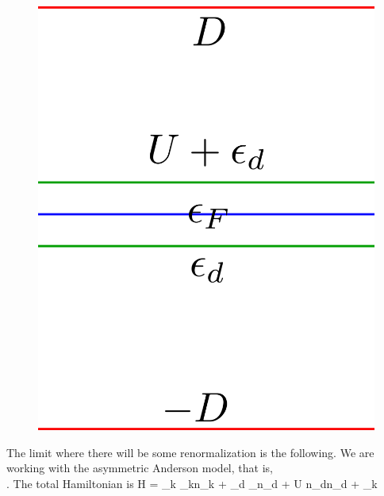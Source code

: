 \documentclass[14pt]{extarticle}
\numberwithin{equation}{section}
\begin{document}
\begin{figure}
\begin{minipage}{220pt}
       	\includegraphics[scale=0.28]{anderson2.png}
       	\label{and2}
\end{minipage}
\end{figure}
The limit where there will be some renormalization is the following. We are working with the asymmetric Anderson model, that is,\\ . The total Hamiltonian is
\beq
H = \sum_{k\sigma} \epsilon_{k\sigma}n_{k\sigma} + \epsilon_d \sum_\sigma n_{d\sigma} + U n_{d\ua}n_{d\da} + \sum_{k\sigma}
\end{document}
